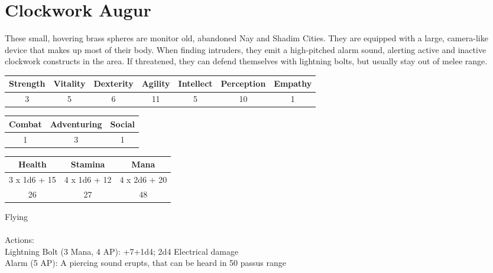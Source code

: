 \pagebreak
\section{Clockwork Augur}

These small, hovering brass spheres are monitor old, abandoned Nay and Shadim Cities. They are equipped with a large, camera-like device that makes up most of their body. When finding intruders, they emit a high-pitched alarm sound, alerting active and inactive clockwork constructs in the area. If threatened, they can defend themselves with lightning bolts, but usually stay out of melee range.\\

\begin{minipage}[H]{1\textwidth}
	\centering
	\begin{tabular}[c]{|c | c | c | c | c | c | c|}
		\hline
		Strength & Vitality & Dexterity & Agility & Intellect & Perception & Empathy\\
		\hline
		3 & 5 & 6 & 11 & 5 & 10 & 1\\
		\hline
	\end{tabular}
\end{minipage}
\bigbreak
\begin{minipage}[H]{1\textwidth}
	\centering
	\begin{tabular}[c]{|c | c | c|}
		\hline
		Combat & Adventuring & Social\\
		\hline
		1 & 3 & 1\\
		\hline
	\end{tabular}
\end{minipage}
\bigbreak
\begin{minipage}[H]{1\textwidth}
	\centering
	\begin{tabular}[c]{|c | c | c|}
		\hline
		Health & Stamina & Mana\\
		\hline
		3 x 1d6 + 15 & 4 x 1d6 + 12 & 4 x 2d6 + 20\\
		26 & 27 & 48\\
		\hline
	\end{tabular}
\end{minipage}
\noindent
Flying\\
\\
Actions:\\
Lightning Bolt (3 Mana, 4 AP): +7+1d4; 2d4 Electrical damage\\
Alarm (5 AP): A piercing sound erupts, that can be heard in 50 passus range\\
